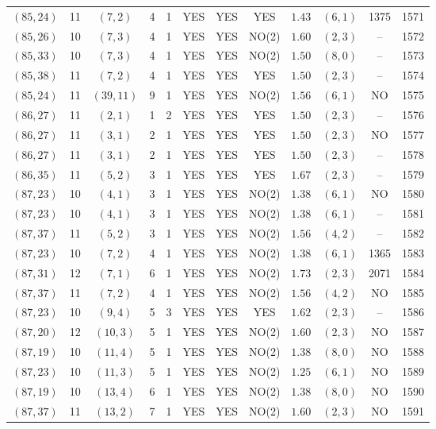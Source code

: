 \begin{longtable}{|c|c|c|c|c|c|c|c|c|c|c|c|}
$(85,24)$ & 11 & $(7,2)$ & 4 & 1 & YES & YES & YES & $1.43$ & $(6,1)$ & 1375 & 1571\\
$(85,26)$ & 10 & $(7,3)$ & 4 & 1 & YES & YES & NO(2) & $1.60$ & $(2,3)$ & -- & 1572\\
$(85,33)$ & 10 & $(7,3)$ & 4 & 1 & YES & YES & NO(2) & $1.50$ & $(8,0)$ & -- & 1573\\
$(85,38)$ & 11 & $(7,2)$ & 4 & 1 & YES & YES & YES & $1.50$ & $(2,3)$ & -- & 1574\\
$(85,24)$ & 11 & $(39,11)$ & 9 & 1 & YES & YES & NO(2) & $1.56$ & $(6,1)$ & NO & 1575\\
$(86,27)$ & 11 & $(2,1)$ & 1 & 2 & YES & YES & YES & $1.50$ & $(2,3)$ & -- & 1576\\
$(86,27)$ & 11 & $(3,1)$ & 2 & 1 & YES & YES & YES & $1.50$ & $(2,3)$ & NO & 1577\\
$(86,27)$ & 11 & $(3,1)$ & 2 & 1 & YES & YES & YES & $1.50$ & $(2,3)$ & -- & 1578\\
$(86,35)$ & 11 & $(5,2)$ & 3 & 1 & YES & YES & YES & $1.67$ & $(2,3)$ & -- & 1579\\
$(87,23)$ & 10 & $(4,1)$ & 3 & 1 & YES & YES & NO(2) & $1.38$ & $(6,1)$ & NO & 1580\\
$(87,23)$ & 10 & $(4,1)$ & 3 & 1 & YES & YES & NO(2) & $1.38$ & $(6,1)$ & -- & 1581\\
$(87,37)$ & 11 & $(5,2)$ & 3 & 1 & YES & YES & NO(2) & $1.56$ & $(4,2)$ & -- & 1582\\
$(87,23)$ & 10 & $(7,2)$ & 4 & 1 & YES & YES & NO(2) & $1.38$ & $(6,1)$ & 1365 & 1583\\
$(87,31)$ & 12 & $(7,1)$ & 6 & 1 & YES & YES & NO(2) & $1.73$ & $(2,3)$ & 2071 & 1584\\
$(87,37)$ & 11 & $(7,2)$ & 4 & 1 & YES & YES & NO(2) & $1.56$ & $(4,2)$ & NO & 1585\\
$(87,23)$ & 10 & $(9,4)$ & 5 & 3 & YES & YES & YES & $1.62$ & $(2,3)$ & -- & 1586\\
$(87,20)$ & 12 & $(10,3)$ & 5 & 1 & YES & YES & NO(2) & $1.60$ & $(2,3)$ & NO & 1587\\
$(87,19)$ & 10 & $(11,4)$ & 5 & 1 & YES & YES & NO(2) & $1.38$ & $(8,0)$ & NO & 1588\\
$(87,23)$ & 10 & $(11,3)$ & 5 & 1 & YES & YES & NO(2) & $1.25$ & $(6,1)$ & NO & 1589\\
$(87,19)$ & 10 & $(13,4)$ & 6 & 1 & YES & YES & NO(2) & $1.38$ & $(8,0)$ & NO & 1590\\
$(87,37)$ & 11 & $(13,2)$ & 7 & 1 & YES & YES & NO(2) & $1.60$ & $(2,3)$ & NO & 1591\\

\end{longtable}
